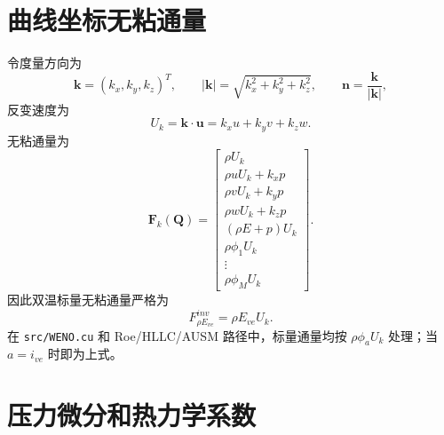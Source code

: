\documentclass[11pt,a4paper,fontset=fandol]{ctexart}
\newcommand{\ve}{ve}
\newcommand{\kk}{\bm{k}}
\newcommand{\nn}{\bm{n}}
\newcommand{\uu}{\bm{u}}
\newcommand{\QQ}{\bm{Q}}
\newcommand{\FF}{\bm{F}}
\begin{document}
\section{曲线坐标无粘通量}

令度量方向为
\[
\kk=(k_x,k_y,k_z)^T,\qquad |\kk|=\sqrt{k_x^2+k_y^2+k_z^2},
\qquad \nn=\frac{\kk}{|\kk|},
\]
反变速度为
\[
U_k=\kk\cdot\uu=k_xu+k_yv+k_zw .
\]
无粘通量为
\[
\FF_k(\QQ)=
\begin{bmatrix}
\rho U_k\\
\rho uU_k+k_xp\\
\rho vU_k+k_yp\\
\rho wU_k+k_zp\\
(\rho E+p)U_k\\
\rho\phi_1U_k\\
\vdots\\
\rho\phi_MU_k
\end{bmatrix}.
\]
因此双温标量无粘通量严格为
\[
F_{\rho E_{\ve}}^{inv}=\rho E_{\ve}U_k .
\]
在 \texttt{src/WENO.cu} 和 Roe/HLLC/AUSM 路径中，标量通量均按
\(\rho\phi_a U_k\) 处理；当 \(a=i_{\ve}\) 时即为上式。

\section{压力微分和热力学系数}
\end{document}
